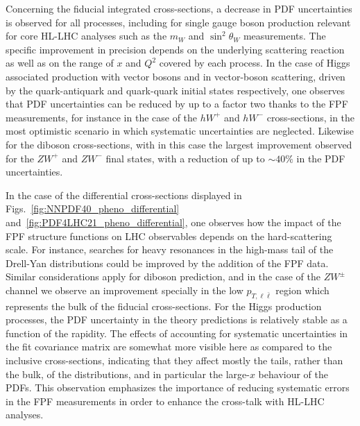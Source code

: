 Concerning the fiducial integrated cross-sections, a decrease in PDF
uncertainties is observed for all processes,
including for single gauge boson production relevant for core
HL-LHC analyses such as the $m_W$ and $\sin^2\theta_W$ measurements.
%
The specific improvement in precision depends
on the underlying scattering reaction as well as on the range
of $x$ and $Q^2$ covered by each process.
%
In the case of  Higgs associated production with vector bosons and in vector-boson
scattering,
driven by the quark-antiquark and quark-quark initial states respectively,
one observes that PDF uncertainties can  be reduced
by up to a factor two thanks to the FPF measurements, for instance
in the case of the $hW^+$ and $hW^-$ cross-sections,
in the most optimistic scenario in which systematic uncertainties
are neglected.
%
Likewise for the diboson cross-sections, with in this case the largest
improvement observed for the $ZW^+$  and  $ZW^-$ final states, with a reduction
of up to $\sim 40\%$ in the PDF uncertainties.

In the case of the differential cross-sections displayed in Figs.~\ref{fig:NNPDF40_pheno_differential}
and~\ref{fig:PDF4LHC21_pheno_differential},
one observes
how the impact of the FPF structure functions on LHC observables depends
on the hard-scattering scale.
%
For instance, searches for heavy resonances in the high-mass tail of the Drell-Yan
distributions could be improved by the addition of the FPF data.
%
Similar considerations apply for diboson prediction, and in the case of the $ZW^{\pm}$ channel we observe
an improvement specially in the low $p_{T,\ell\bar{\ell}}$ region which
represents the bulk of the fiducial cross-sections.
%
For the Higgs production processes, the PDF uncertainty in the theory predictions is relatively
stable as a function of the rapidity.
%
The effects of accounting for systematic uncertainties in the fit covariance
matrix are somewhat more visible here as compared to the inclusive cross-sections,
indicating that they affect mostly
the tails, rather than the bulk, of the distributions, and in particular the large-$x$
behaviour of the PDFs.
%
This observation emphasizes the importance of reducing systematic errors
in the FPF measurements in order to enhance the cross-talk with HL-LHC analyses.


